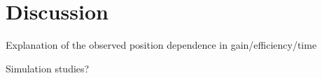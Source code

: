 \section{Discussion}

Explanation of the observed position dependence in gain/efficiency/time

Simulation studies?
